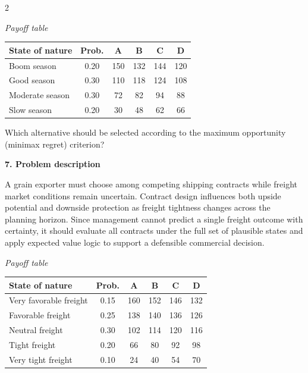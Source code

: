 \documentclass[12pt]{article}
\newcommand{\SubsectionBox}[1]{%
	\noindent\colorbox{gray!30}{%
		\parbox{\linewidth}{\textbf{#1}}%
	}\par\vspace{0.35cm}%
}
\begin{document}
\begin{multicols}{2}
				\begin{center}
					\textit{Payoff table} \par
					\begin{tabular}{l c c c c c}
						\toprule
						State of nature & Prob. & A & B & C & D \\
						\midrule
						Boom season & 0.20 & 150 & 132 & 144 & 120 \\
						Good season & 0.30 & 110 & 118 & 124 & 108 \\
						Moderate season & 0.30 & 72 & 82 & 94 & 88 \\
						Slow season & 0.20 & 30 & 48 & 62 & 66 \\
						\bottomrule
					\end{tabular}
				\end{center}
		
				Which alternative should be selected according to the maximum opportunity (minimax regret) criterion?

		\vspace{0.25cm}
		\SubsectionBox{7. Problem description}\vspace{-0.25cm}
		A grain exporter must choose among competing shipping contracts while freight market conditions remain uncertain. Contract design influences both upside potential and downside protection as freight tightness changes across the planning horizon. Since management cannot predict a single freight outcome with certainty, it should evaluate all contracts under the full set of plausible states and apply expected value logic to support a defensible commercial decision.
		
				\begin{center}
					\textit{Payoff table}
					\begin{tabular}{l c c c c c}
						\toprule
						State of nature & Prob. &  A & B & C & D \\
						\midrule
						Very favorable freight & 0.15 & 160 & 152 & 146 & 132 \\
						Favorable freight & 0.25 & 138 & 140 & 136 & 126 \\
						Neutral freight & 0.30 & 102 & 114 & 120 & 116 \\
						Tight freight & 0.20 & 66 & 80 & 92 & 98 \\
						Very tight freight & 0.10 & 24 & 40 & 54 & 70 \\
						\bottomrule
					\end{tabular}
				\end{center}
		

\end{multicols}
\end{document}
